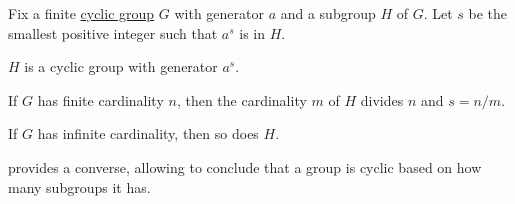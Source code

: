 \begin{proposition}\label{thm:cyclic_subgroup_classification}
  Fix a finite \hyperref[def:cyclic_group]{cyclic group} \( G \) with generator \( a \) and a subgroup \( H \) of \( G \). Let \( s \) be the smallest positive integer such that \( a^s \) is in \( H \).

  \begin{thmenum}
     \( H \) is a cyclic group with generator \( a^s \).

     If \( G \) has finite cardinality \( n \), then the cardinality \( m \) of \( H \) divides \( n \) and \( s = n / m \).

     If \( G \) has infinite cardinality, then so does \( H \).
  \end{thmenum}
\end{proposition}
\begin{comments}
  \item {} provides a converse, allowing to conclude that a group is cyclic based on how many subgroups it has.
\end{comments}
